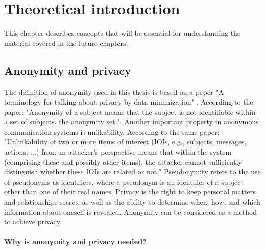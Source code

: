 \chapter{Theoretical introduction}

This chapter describes concepts that will be essential for understanding the material covered in the future chapters.

\section{Anonymity and privacy}
The definition of anonymity used in this thesis is based on a paper "A terminology for talking about privacy by data minimization" \cite{anon-terminology}.
According to the paper: "Anonymity of a subject means that the subject is not identifiable within a set of subjects, the anonymity set.". Another important property in anonymous communication systems is unlikability. According to the same paper: "Unlinkability of two or more items of interest (IOIs, e.g., subjects, messages, actions, ...) from an attacker’s perspective means that within the system (comprising these and possibly other items), the attacker cannot sufficiently distinguish whether these IOIs are related or not."
Pseudonymity refers to the use of pseudonyms as identifiers, where a pseudonym is an identifier of a subject other than one of their real names.
Privacy is the right to keep personal matters and relationships secret, as well as the ability to determine when, how, and which information about oneself is revealed.
Anonymity can be considered as a method to achieve privacy.

\subsubsection{Why is anonymity and privacy needed?}

